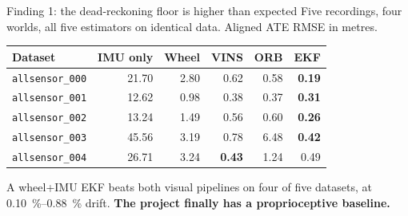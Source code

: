 \documentclass[aspectratio=169,11pt]{beamer}
\newcommand{\code}[1]{\texttt{\small #1}}
\newcommand{\bad}[1]{\textcolor{flagred}{#1}}
\begin{document}
\begin{frame}{Finding 1: the dead-reckoning floor is higher than expected}
  Five recordings, four worlds, all five estimators on identical data.
  Aligned ATE RMSE in metres.

  \vspace{0.5em}
  \centering\small
  \begin{tabular}{lrrrrr}
    \toprule
    Dataset & IMU only & Wheel & VINS & ORB & \textbf{EKF} \\
    \midrule
    \code{allsensor\_000} & 21.70 & 2.80 & 0.62 & 0.58 & \textbf{0.19} \\
    \code{allsensor\_001} & 12.62 & 0.98 & 0.38 & 0.37 & \textbf{0.31} \\
    \code{allsensor\_002} & 13.24 & 1.49 & 0.56 & 0.60 & \textbf{0.26} \\
    \code{allsensor\_003} & 45.56 & 3.19 & 0.78 & \bad{6.48} & \textbf{0.42} \\
    \code{allsensor\_004} & 26.71 & 3.24 & \textbf{0.43} & 1.24 & 0.49 \\
    \bottomrule
  \end{tabular}

  \vspace{0.8em}
  \begin{alertblock}{}
    A wheel+IMU EKF beats both visual pipelines on four of five datasets, at
    \SIrange{0.10}{0.88}{\percent} drift. \textbf{The project finally has a
    proprioceptive baseline.}
  \end{alertblock}
\end{frame}
\end{document}
